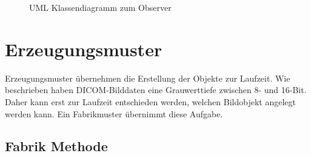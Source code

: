 \begin{figure}[htbp]
  \vspace{0.5cm}
  \centering
   \caption{UML Klassendiagramm zum Observer}
  \label{observer}
  \vspace{0.5cm}
\end{figure}


\section{Erzeugungsmuster}
Erzeugungsmuster übernehmen die Erstellung der Objekte zur Laufzeit. Wie beschrieben haben DICOM-Bilddaten eine Grauwerttiefe zwischen 8- und 16-Bit. Daher kann erst zur Laufzeit entschieden werden, welchen Bildobjekt angelegt werden kann. Ein Fabrikmuster übernimmt diese Aufgabe.


\subsection{Fabrik Methode}

